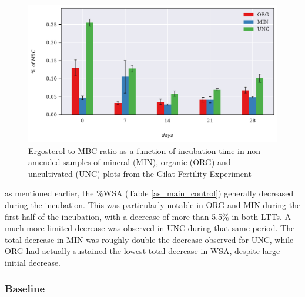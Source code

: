 			\begin{figure}[H]
					\centering
					\includegraphics[scale=0.8, width=\linewidth]{thesis_figures/main_incubation/control/Erg-to-MBC.pdf}
					\caption{Ergosterol-to-MBC ratio as a function of incubation time in non-amended samples of mineral (MIN), organic (ORG) and uncultivated (UNC) plots from the Gilat Fertility Experiment}
					\label{fig:erg_to_biomass_control_main}
			\end{figure}
			\noindent as mentioned earlier, the $ \% $WSA (Table \ref{as_main_control}) generally decreased   during the incubation. This was particularly notable in ORG and MIN during the first half of the incubation, with a decrease of more than 5.5\% in both LTTs. A much more limited decrease was observed in UNC during that same period. The total decrease in MIN was roughly double the decrease observed for UNC, while ORG had actually sustained the lowest total decrease in WSA, despite large initial decrease. \\
%

			
		\subsubsection{Baseline}
		\label{Baseline}

